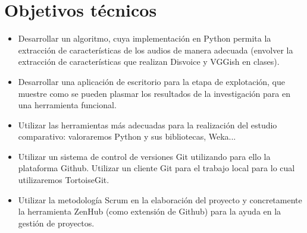 \section{Objetivos técnicos}
\begin{itemize}
	\item Desarrollar un algoritmo, cuya implementación en Python permita la extracción de características de los audios de manera adecuada (envolver la extracción de características que realizan Disvoice y VGGish en clases).
	\item Desarrollar una aplicación de escritorio para la etapa de explotación, que muestre como se pueden plasmar los resultados de la investigación para en una herramienta funcional. 
	\item Utilizar las herramientas más adecuadas para la realización del estudio comparativo: valoraremos Python y sus bibliotecas, Weka...
	\item Utilizar un sistema de control de versiones Git utilizando para ello la plataforma Github. Utilizar un cliente Git para el trabajo local para lo cual utilizaremos TortoiseGit.
	\item Utilizar la metodología Scrum en la elaboración del proyecto y concretamente la herramienta ZenHub (como extensión de Github) para la ayuda en la gestión de proyectos.
	
	
\end{itemize}